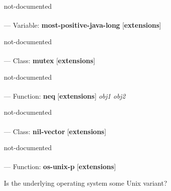 \begin{adjustwidth}{5em}{5em}
not-documented
\end{adjustwidth}

\paragraph{}
\label{EXTENSIONS:MOST-POSITIVE-JAVA-LONG}
--- Variable: \textbf{most-positive-java-long} [\textbf{extensions}] \textit{}

\begin{adjustwidth}{5em}{5em}
not-documented
\end{adjustwidth}

\paragraph{}
\label{EXTENSIONS:MUTEX}
--- Class: \textbf{mutex} [\textbf{extensions}] \textit{}

\begin{adjustwidth}{5em}{5em}
not-documented
\end{adjustwidth}

\paragraph{}
\label{EXTENSIONS:NEQ}
--- Function: \textbf{neq} [\textbf{extensions}] \textit{obj1 obj2}

\begin{adjustwidth}{5em}{5em}
not-documented
\end{adjustwidth}

\paragraph{}
\label{EXTENSIONS:NIL-VECTOR}
--- Class: \textbf{nil-vector} [\textbf{extensions}] \textit{}

\begin{adjustwidth}{5em}{5em}
not-documented
\end{adjustwidth}

\paragraph{}
\label{EXTENSIONS:OS-UNIX-P}
--- Function: \textbf{os-unix-p} [\textbf{extensions}] \textit{}

\begin{adjustwidth}{5em}{5em}
Is the underlying operating system some Unix variant?
\end{adjustwidth}

